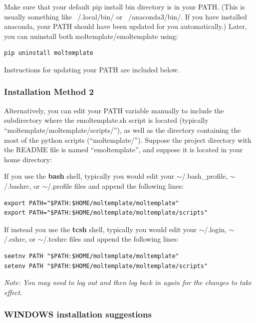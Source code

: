 \documentclass[11pt]{article}
\begin{document}

Make sure that your default pip install bin directory is in your PATH.  (This is usually something like ~/.local/bin/ or ~/anaconda3/bin/.  If you have installed anaconda, your PATH should have been updated for you automatically.)  Later, you can uninstall both moltemplate/emoltemplate using:
\begin{verbatim}
pip uninstall moltemplate
\end{verbatim}
Instructions for updating your PATH are included below.


\subsubsection*{Installation Method 2}

Alternatively, you can edit your PATH variable manually to include
the subdirectory where the emoltemplate.sh script is located 
(typically ``moltemplate/moltemplate/scripts/''), as well as 
the directory containing the most of the python scripts (``moltemplate/'').
Suppose the project directory with the README file is named
``emoltemplate'', and suppose it is located in your home directory:

If you use the \textbf{bash} shell, typically you would edit your 
\mbox{$\sim$/.bash\_profile}, 
\mbox{$\sim$/.bashrc}, or 
\mbox{$\sim$/.profile} files
and append the following lines:
\begin{verbatim}
export PATH="$PATH:$HOME/moltemplate/moltemplate"
export PATH="$PATH:$HOME/moltemplate/moltemplate/scripts"
\end{verbatim}
If instead you use the \textbf{tcsh} shell, typically you would edit your 
\mbox{$\sim$/.login}, 
\mbox{$\sim$/.cshrc}, or 
\mbox{$\sim$/.tcshrc} files 
and append the following lines:
\begin{verbatim}
seetnv PATH "$PATH:$HOME/moltemplate/moltemplate"
setenv PATH "$PATH:$HOME/moltemplate/moltemplate/scripts"
\end{verbatim}


\textit{Note: You may need to log out and then 
log back in again for the changes to take effect.}


\subsubsection*{WINDOWS installation suggestions}
\end{document}
